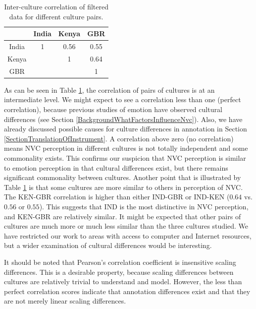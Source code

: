 

\begin{table}
\centering
\caption{Inter-culture correlation of filtered data for different culture pairs.}
\begin{tabular}{ | c | c c c | }
\hline
 & India & Kenya & GBR \\
\hline
\hline
India & 1 & 0.56 & 0.55\\
Kenya &  & 1 & 0.64 \\
GBR    &  &  & 1 \\
\hline
\end{tabular}
\label{InterCultureCorrelationTable}
\end{table}

As can be seen in Table \ref{InterCultureCorrelationTable}, the correlation of pairs of cultures is at an intermediate level. We might expect to see a correlation less than one (perfect correlation), because previous studies of emotion have observed cultural differences (see Section \ref{BackgroundWhatFactorsInfluenceNvc}). Also, we have already discussed possible causes for culture differences in annotation in Section \ref{SectionTranslationOfInstrument}. A correlation above zero (no correlation) means \ac{NVC} perception in different cultures is not totally independent and some commonality exists. This confirms our suspicion that \ac{NVC} perception is similar to emotion perception in that cultural differences exist, but there remains significant commonality between cultures. Another point that is illustrated by Table \ref{InterCultureCorrelationTable} is that some cultures are more similar to others in perception of \ac{NVC}. The KEN-GBR correlation is higher than either IND-GBR or IND-KEN ($0.64$ vs. $0.56$ or $0.55$). This suggests that IND is the most distinctive in \ac{NVC} perception, and KEN-GBR are relatively similar. It might be expected that other pairs of cultures are much more or much less similar than the three cultures studied. We have restricted our work to areas with access to computer and Internet resources, but a wider examination of cultural differences would be interesting.

It should be noted that Pearson's correlation coefficient is insensitive scaling differences. This is a desirable property, because scaling differences between cultures are relatively trivial to understand and model. However, the less than perfect correlation scores indicate that annotation differences exist and that they are not merely linear scaling differences.

